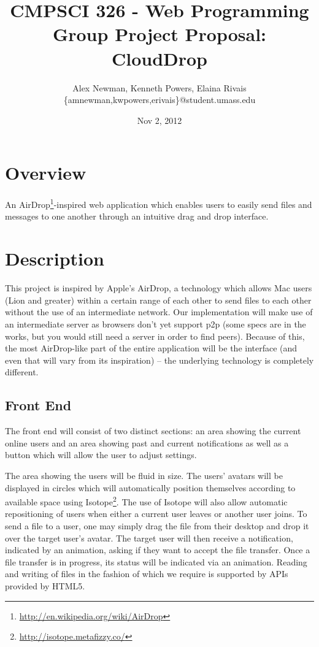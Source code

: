 \documentclass[letterpaper, 10pt]{article}
\author{Alex Newman, Kenneth Powers, Elaina Rivais\\\{amnewman,kwpowers,erivais\}@student.umass.edu}
\date{Nov 2, 2012}
\title{CMPSCI 326 - Web Programming \\ Group Project Proposal: CloudDrop}
\begin{document}
	\maketitle
	\section{Overview}
	An AirDrop\footnote{\url{http://en.wikipedia.org/wiki/AirDrop}}-inspired web application which enables users to easily send files and messages to one another through an intuitive drag and drop interface.

	\section{Description}
	This project is inspired by Apple's AirDrop, a technology which allows Mac users (Lion and greater) within a certain range of each other to send files to each other without the use of an intermediate network. Our implementation will make use of an intermediate server as browsers don't yet support p2p (some specs are in the works, but you would still need a server in order to find peers). Because of this, the most AirDrop-like part of the entire application will be the interface (and even that will vary from its inspiration) -- the underlying technology is completely different.

	\subsection{Front End}
	The front end will consist of two distinct sections: an area showing the current online users and an area showing past and current notifications as well as a button which will allow the user to adjust settings.

	The area showing the users will be fluid in size. The users' avatars will be displayed in circles which will automatically position themselves according to available space using Isotope\footnote{\url{http://isotope.metafizzy.co/}}. The use of Isotope will also allow automatic repositioning of users when either a current user leaves or another user joins. To send a file to a user, one may simply drag the file from their desktop and drop it over the target user's avatar. The target user will then receive a notification, indicated by an animation, asking if they want to accept the file transfer. Once a file transfer is in progress, its status will be indicated via an animation. Reading and writing of files in the fashion of which we require is supported by APIs provided by HTML5.
\end{document}
